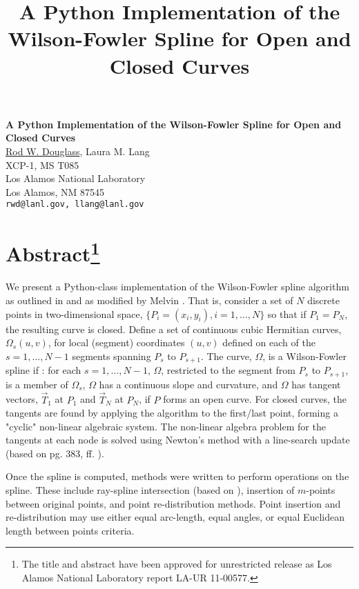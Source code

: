 \title{A Python Implementation of the Wilson-Fowler Spline for Open and Closed Curves}
\author{} \institute{}

\begin{center}

\textbf{\Large A Python Implementation of the Wilson-Fowler Spline for Open and Closed Curves}\\
\vspace{10mm}
{\large \underline{Rod W. Douglass}, Laura M. Lang}\\
XCP-1, MS T085\\
Los Alamos National Laboratory \\
Los Alamos, NM 87545\\
{\tt rwd@lanl.gov, llang@lanl.gov}

\end{center}

\section*{Abstract\footnote{The title and abstract have been approved for unrestricted release as Los Alamos 
National Laboratory report LA-UR 11-00577.}}

We present a Python-class implementation of the Wilson-Fowler spline algorithm as outlined in \cite{Wilson66} and as modified by Melvin \cite{Melvin82}.  That is, consider a set of $N$ discrete points in two-dimensional space, $\{P_i = (x_i, y_i), i = 1,\ldots,N\}$ so that if $P_1 = P_{N}$, the resulting curve is closed.  Define a set of continuous cubic Hermitian curves, $\Omega_s(u,v)$,  for local (segment) coordinates $(u,v)$ defined on each of the $s = 1,\ldots,N-1$ segments spanning $P_s$ to $P_{s+1}$. The curve, $\Omega$, is a Wilson-Fowler spline if \cite{Melvin82}: for each $s = 1, \ldots, N-1$, $\Omega$, restricted to the segment from $P_s$ to $P_{s+1}$, is a member of $\Omega_s$, $\Omega$ has a continuous slope and curvature, and $\Omega$ has tangent vectors, $\vec{T}_1$ at $P_1$ and $\vec{T}_{N}$ at $P_{N}$, if $P$ forms an open curve.  For closed curves, the tangents are found by applying the algorithm to the first/last point, forming a "cyclic" non-linear algebraic system.  The non-linear algebra problem for the tangents at each node is solved using Newton's method with a line-search update (based on pg. 383, ff. \cite{Press92}).

Once the spline is computed, methods were written to perform operations on the spline.  These include ray-spline intersection (based on \cite{Williams03}), insertion of $m$-points between original points, and point re-distribution methods.  Point insertion and re-distribution may use either equal arc-length, equal angles, or equal Euclidean length between points criteria.

